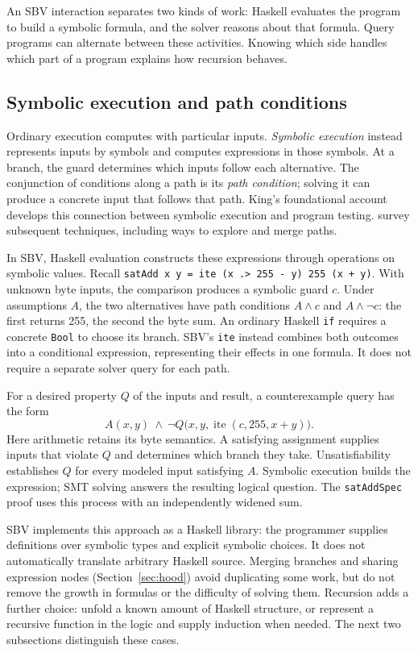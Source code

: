 \documentclass[review]{jfp-epi}
\newcommand{\code}[1]{\texttt{#1}}
\begin{document}
An SBV interaction separates two kinds of work: Haskell evaluates the program
to build a symbolic formula, and the solver reasons about that formula. Query
programs can alternate between these activities. Knowing which side handles
which part of a program explains how recursion behaves.

\subsection{Symbolic execution and path conditions}
\label{sec:symbolic-execution}

Ordinary execution computes with particular inputs. \emph{Symbolic execution}
instead represents inputs by symbols and computes expressions in those symbols.
At a branch, the guard determines which inputs follow each alternative. The
conjunction of conditions along a path is its \emph{path condition}; solving it
can produce a concrete input that follows that path. King’s foundational
account~\citep{king-symbolic-execution} develops this connection between symbolic
execution and program testing. \citet{symbolic-execution-survey} survey subsequent
techniques, including ways to explore and merge paths.

In SBV, Haskell evaluation constructs these expressions through operations on
symbolic values. Recall \code{satAdd x y = ite (x .> 255 - y) 255 (x + y)}.
With unknown byte inputs, the comparison produces a symbolic guard $c$.
Under assumptions $A$, the two alternatives have path conditions $A\land c$
and $A\land\neg c$: the first returns 255, the second the byte sum.
An ordinary Haskell \code{if} requires a concrete \code{Bool} to choose its
branch. SBV's \code{ite} instead combines both outcomes into a conditional
expression, representing their effects in one formula. It does not require a
separate solver query for each path.

For a desired property $Q$ of the inputs and result, a counterexample query has
the form
\[
  A(x,y)\ \land\ \neg Q\bigl(x,y,\operatorname{ite}(c,255,x+y)\bigr).
\]
Here arithmetic retains its byte semantics. A satisfying assignment supplies
inputs that violate $Q$ and determines which branch they take. Unsatisfiability
establishes $Q$ for every modeled input satisfying $A$. Symbolic execution builds
the expression; SMT solving answers the resulting logical question. The
\code{satAddSpec} proof uses this process with an independently widened sum.

SBV implements this approach as a Haskell library: the programmer supplies
definitions over symbolic types and explicit symbolic choices. It does not
automatically translate arbitrary Haskell source. Merging branches and sharing
expression nodes (Section~\ref{sec:hood}) avoid duplicating some work, but do not
remove the growth in formulas or the difficulty of solving them. Recursion adds
a further choice: unfold a known amount of Haskell structure, or represent a
recursive function in the logic and supply induction when needed. The next two
subsections distinguish these cases.
\end{document}
